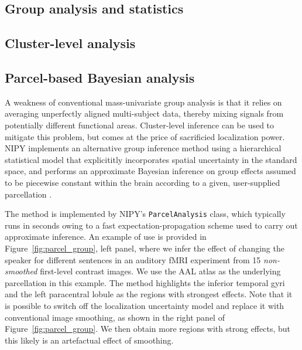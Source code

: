 \documentclass{bioinfo}
\begin{document}
\subsection{Group analysis and statistics}



\subsection{Cluster-level analysis}



\subsection{Parcel-based Bayesian analysis}

A weakness of conventional mass-univariate group analysis is that it
relies on averaging unperfectly aligned multi-subject data, thereby
mixing signals from potentially different functional
areas. Cluster-level inference can be used to mitigate this problem,
but comes at the price of sacrificied localization power. NIPY
implements an alternative group inference method using a hierarchical
statistical model that explicititly incorporates spatial uncertainty
in the standard space, and performs an approximate Bayesian inference
on group effects assumed to be piecewise constant within the brain
according to a given, user-supplied parcellation
\citep{keller:sinica:08,keller:miccai:09}. 

The method is implemented by NIPY's {\tt ParcelAnalysis} class, which
typically runs in seconds owing to a fast expectation-propagation
scheme \citep{minka:techrep:05} used to carry out approximate
inference. An example of use is provided in
Figure~\ref{fig:parcel_group}, left panel, where we infer the effect
of changing the speaker for different sentences in an auditory fMRI
experiment from 15 {\em non-smoothed} first-level contrast images. We
use the AAL atlas \citep{tzourio:ni:02} as the underlying parcellation
in this example. The method highlights the inferior temporal gyri and
the left paracentral lobule as the regions with strongest
effects. Note that it is possible to switch off the localization
uncertainty model and replace it with conventional image smoothing, as
shown in the right panel of Figure~\ref{fig:parcel_group}. We then
obtain more regions with strong effects, but this likely is an
artefactual effect of smoothing.
\end{document}
